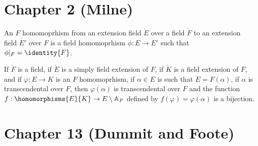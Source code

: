 \documentclass{article}                                                        %
\begin{document}
    \section{Chapter 2 (Milne)}
        \begin{definition}
            An $F$ homomoprhism from an extension field $\ring{E}$ over a field
            $\ring{F}$ to an extension field $\ring{E'}$  over $F$ is a field
            homomoprhism $\phi:E\rightarrow{E}'$ such that
            $\phi|_{F}=\identity{F}$.
        \end{definition}
        \begin{theorem}
            If $\ring{F}$ is a field, if $\ring{E}$ is a simply field extension
            of $F$, if $\ring{K}$ is a field extension of $F$, and if
            $\varphi:E\rightarrow{K}$ is an $F$ homomoprhism, if $\alpha\in{E}$
            is such that $E=F(\alpha)$, if $\alpha$ is transcendental over $F$,
            then $\varphi(\alpha)$ is transcendental over $F$ and the function
            $f:\homomorphisms{E}{K}\rightarrow{E}\setminus\mathbb{A}_{F}$
            defined by $f(\varphi)=\varphi(\alpha)$ is a bijection.
        \end{theorem}
    \section{Chapter 13 (Dummit and Foote)}
\end{document}
